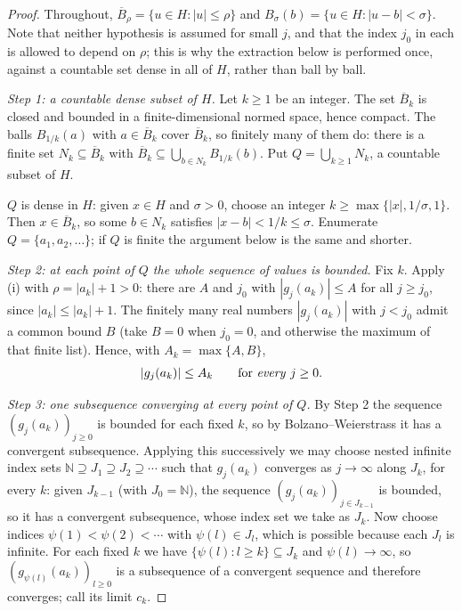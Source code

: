 \begin{proof}
Throughout, $\overline B_\rho=\{u\in H:|u|\le\rho\}$ and
$B_\sigma(b)=\{u\in H:|u-b|<\sigma\}$. Note that neither hypothesis is assumed
for small $j$, and that the index $j_0$ in each is allowed to depend on $\rho$;
this is why the extraction below is performed once, against a countable set
dense in all of $H$, rather than ball by ball.

\emph{Step 1: a countable dense subset of $H$.}
Let $k\ge1$ be an integer. The set $\overline B_k$ is closed and bounded in a
finite-dimensional normed space, hence compact. The balls $B_{1/k}(a)$ with
$a\in\overline B_k$ cover $\overline B_k$, so finitely many of them do: there is
a finite set $N_k\subseteq\overline B_k$ with
$\overline B_k\subseteq\bigcup_{b\in N_k}B_{1/k}(b)$. Put
$Q=\bigcup_{k\ge1}N_k$, a countable subset of $H$.

$Q$ is dense in $H$: given $x\in H$ and $\sigma>0$, choose an integer
$k\ge\max\{|x|,1/\sigma,1\}$. Then $x\in\overline B_k$, so some $b\in N_k$
satisfies $|x-b|<1/k\le\sigma$. Enumerate $Q=\{a_1,a_2,\dots\}$; if $Q$ is
finite the argument below is the same and shorter.

\emph{Step 2: at each point of $Q$ the whole sequence of values is bounded.}
Fix $k$. Apply (i) with $\rho=|a_k|+1>0$: there are $A$ and $j_0$ with
$|g_j(a_k)|\le A$ for all $j\ge j_0$, since $|a_k|\le|a_k|+1$. The finitely many
real numbers $|g_j(a_k)|$ with $j<j_0$ admit a common bound $B$ (take $B=0$ when
$j_0=0$, and otherwise the maximum of that finite list). Hence, with
$A_k=\max\{A,B\}$,
\[
  |g_j(a_k)|\le A_k\qquad\text{for \emph{every} }j\ge0 .
\]

\emph{Step 3: one subsequence converging at every point of $Q$.}
By Step 2 the sequence $(g_j(a_k))_{j\ge0}$ is bounded for each fixed $k$, so by
Bolzano--Weierstrass it has a convergent subsequence. Applying this successively
we may choose nested infinite index sets
$\mathbb N\supseteq J_1\supseteq J_2\supseteq\cdots$ such that $g_j(a_k)$
converges as $j\to\infty$ along $J_k$, for every $k$: given $J_{k-1}$ (with
$J_0=\mathbb N$), the sequence $(g_j(a_k))_{j\in J_{k-1}}$ is bounded, so it has
a convergent subsequence, whose index set we take as $J_k$. Now choose indices
$\psi(1)<\psi(2)<\cdots$ with $\psi(l)\in J_l$, which is possible because each
$J_l$ is infinite. For each fixed $k$ we have
$\{\psi(l):l\ge k\}\subseteq J_k$ and $\psi(l)\to\infty$, so
$(g_{\psi(l)}(a_k))_{l\ge0}$ is a subsequence of a convergent sequence and
therefore converges; call its limit $c_k$.


\end{proof}
